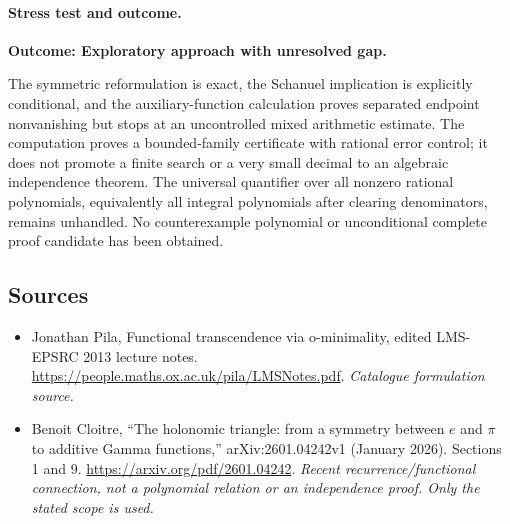 \documentclass[11pt,a4paper]{article}
\numberwithin{equation}{section}
\begin{document}
\paragraph{Stress test and outcome.}
\textbf{Outcome: Exploratory approach with unresolved gap.}

The symmetric reformulation is exact, the Schanuel implication is
explicitly conditional, and the auxiliary-function calculation proves separated endpoint
nonvanishing but stops at an uncontrolled mixed arithmetic estimate. The computation proves
a bounded-family certificate with rational error control; it does not
promote a finite search or a very small decimal to an algebraic
independence theorem. The universal quantifier over all nonzero rational
polynomials, equivalently all integral polynomials after clearing
denominators, remains unhandled. No counterexample polynomial or
unconditional complete proof candidate has been obtained.
\subsection{Sources}
\begin{itemize}\raggedright
\item[\textnormal{[S1]}]\hypertarget{source:3349:1}{} Jonathan Pila, Functional transcendence via o-minimality, edited LMS-EPSRC 2013 lecture notes.
\url{https://people.maths.ox.ac.uk/pila/LMSNotes.pdf}.
{\small\textit{Catalogue formulation source.}}
\item[\textnormal{[E1]}]\hypertarget{extra:3349:1}{} Benoit Cloitre, ``The holonomic triangle: from a symmetry between $e$ and $\pi$ to additive Gamma functions,'' arXiv:2601.04242v1 (January 2026). Sections 1 and 9.
\url{https://arxiv.org/pdf/2601.04242}.
{\small\textit{Recent recurrence/functional connection, not a polynomial relation or an independence proof. Only the stated scope is used.}}
\end{itemize}
\end{document}

